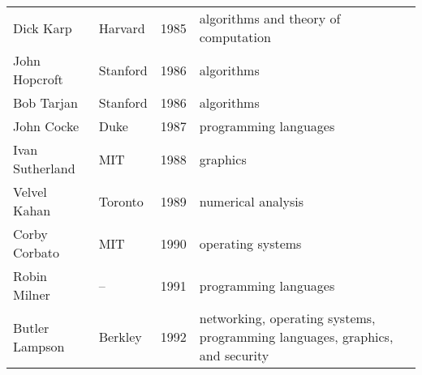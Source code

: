 \documentclass[doublespacing]{utdthesis}
\begin{document}
\begin{table}[p]
\begin{center}
\begin{tabular}{llcp{2.5in}}
Dick Karp & Harvard & 1985 & algorithms and theory of computation \\
John Hopcroft & Stanford & 1986 & algorithms \\
Bob Tarjan & Stanford & 1986 & algorithms \\
John Cocke & Duke & 1987 & programming languages \\
Ivan Sutherland & MIT & 1988 & graphics \\
Velvel Kahan & Toronto & 1989 & numerical analysis \\
Corby Corbato & MIT & 1990 & operating systems \\
Robin Milner & -- & 1991 & programming languages \\
Butler Lampson & Berkley & 1992 & networking, operating systems,
  programming languages, graphics, and security
\end{tabular}
\end{center}
\end{table}
\end{document}

